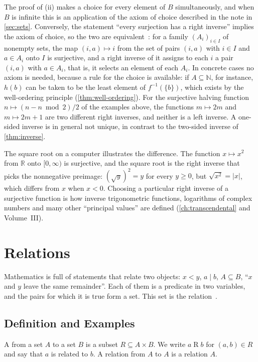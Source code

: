 The proof of (ii) makes a choice for every element of $B$ simultaneously, and when $B$ is infinite this is an application of the axiom of choice described in the note in \cref{sec:sets}. Conversely, the statement ``every surjection has a right inverse'' implies the axiom of choice, so the two are equivalent~\cite{bell2021choice}: for a family $(A_i)_{i\in I}$ of nonempty sets, the map $(i,a)\mapsto i$ from the set of pairs $(i,a)$ with $i\in I$ and $a\in A_i$ onto $I$ is surjective, and a right inverse of it assigns to each $i$ a pair $(i,a)$ with $a\in A_i$, that is, it selects an element of each $A_i$. In concrete cases no axiom is needed, because a rule for the choice is available: if $A\subseteq\mathbb N$, for instance, $h(b)$ can be taken to be the least element of $f^{-1}(\{b\})$, which exists by the well-ordering principle (\cref{thm:well-ordering}). For the surjective halving function $n\mapsto(n-n\bmod2)/2$ of the examples above, the functions $m\mapsto2m$ and $m\mapsto2m+1$ are two different right inverses, and neither is a left inverse. A one-sided inverse is in general not unique, in contrast to the two-sided inverse of \cref{thm:inverse}.

The square root on a computer illustrates the difference. The function $x\mapsto x^2$ from $\mathbb R$ onto $[0,\infty)$ is surjective, and the square root is the right inverse that picks the nonnegative preimage: $(\sqrt y)^2=y$ for every $y\ge0$, but $\sqrt{x^2}=|x|$, which differs from $x$ when $x<0$. Choosing a particular right inverse of a surjective function is how inverse trigonometric functions, logarithms of complex numbers and many other ``principal values'' are defined (\cref{ch:transcendental} and Volume~III).

\section{Relations}
\label{sec:relations}

Mathematics is full of statements that relate two objects: $x<y$, $a\mid b$, $A\subseteq B$, ``$x$ and $y$ leave the same remainder''. Each of them is a predicate in two variables, and the pairs for which it is true form a set. This set is the relation~\cite{enderton1977sets}.

\subsection{Definition and Examples}

\begin{definition}[Relation]
\label{def:relation}
A  from a set $A$ to a set $B$ is a subset $R\subseteq A\times B$. We write $a\mathrel{R}b$ for $(a,b)\in R$ and say that $a$ is related to $b$. A relation from $A$ to $A$ is a relation  $A$.
\end{definition}

